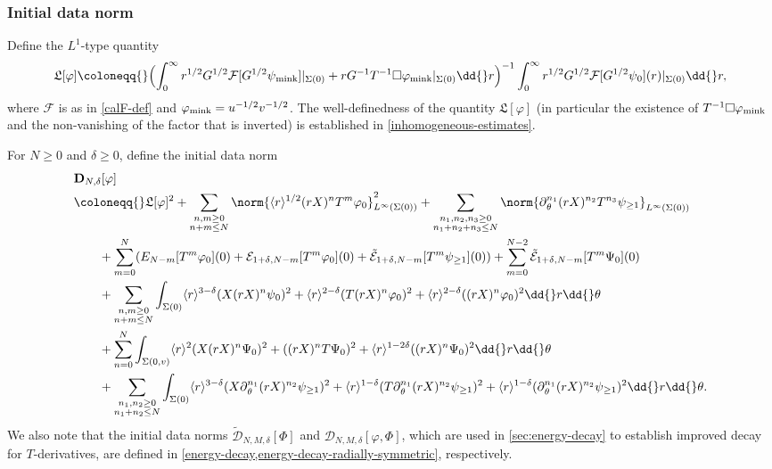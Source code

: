 \documentclass[10pt, reqno]{amsart}
\begin{document}
\subsubsection{Initial data norm}
\label{data-norm}
Define the \(L^1\)-type quantity
\begin{equation}\label{L-frak-def}
\mathfrak{L}[\varphi{}]\coloneqq{}\Bigl(\int_0^\infty r^{1/2}G^{1/2}\mathcal{F}[G^{1/2}\psi{}_{\textnormal{mink}}]|_{\Sigma{}(0)} + rG^{-1}T^{-1}\Box{}\varphi{}_{\textnormal{mink}}|_{\Sigma{}(0)}\dd{}r\Bigr)^{-1}\int_0^\infty r^{1/2}G^{1/2}\mathcal{F}[G^{1/2}\psi{}_0](r)|_{\Sigma{}(0)}\dd{}r,
\end{equation}
where \(\mathcal{F}\) is as in \cref{calF-def} and \(\varphi_{\textnormal{mink}} =
u^{-1/2}v^{-1/2}\). The well-definedness of the quantity
\(\mathfrak{L}[\varphi{}]\) (in particular the existence of
\(T^{-1}\Box{}\varphi_{\textnormal{mink}}\) and the non-vanishing of the factor
that is inverted) is established in \cref{inhomogeneous-estimates}.

For \(N\ge 0\) and \(\delta{} \ge 0\), define the initial data norm
\begin{equation}
\begin{split}
&\mathbf{D}_{N,\delta{}}[\varphi{}]\\
&\coloneqq{}\mathfrak{L}[\varphi{}]^2 +  \sum_{\substack{n,m\ge 0 \\ n+m\le N }}\norm{\langle{}r\rangle^{1/2}(rX)^nT^m\varphi{}_0}_{L^\infty(\Sigma{}(0))}^2 + \sum_{\substack{n_1,n_2,n_3\ge 0 \\ n_1+n_2+n_3\le N }}\norm{\partial{}_\theta^{n_1}(rX)^{n_2}T^{n_3}\psi{}_{\ge 1}}_{L^\infty(\Sigma{}(0))} \\
&\qquad + \sum_{m=0}^{N}(E_{N-m}[T^m\varphi{}_0](0) + \mathcal{E}_{1+\delta{},N-m}[T^m\varphi{}_0](0) + \tilde{\mathcal{E}}_{1+\delta{},N-m}[T^m\psi{}_{\ge 1}](0)) + \sum_{m=0}^{N-2} \tilde{\mathcal{E}}_{1+\delta{},N-m}[T^m\Psi{}_0](0) \\
&\qquad + \sum_{\substack{n,m\ge 0 \\ n+m\le N}} \int _{\Sigma{}(0)} \langle{}r\rangle^{3-\delta{}}(X(rX)^n\psi{}_0)^2 + \langle{}r\rangle^{2-\delta{}}(T(rX)^n\varphi{}_0)^2 + \langle{}r\rangle^{2-\delta{}}((rX)^n\varphi{}_0)^2\dd{}r\dd{}\theta{} \\
&\qquad  + \sum_{n=0}^N \int _{\Sigma{}(0,v)} \langle{}r\rangle^2(X(rX)^n\Psi{}_0)^2 + ((rX)^nT\Psi{}_0)^2 + \langle{}r\rangle^{1-2\delta{}}((rX)^n\Psi{}_0)^2 \dd{}r\dd{}\theta{} \\
&\qquad + \sum_{\substack{n_1,n_2\ge 0 \\ n_1 + n_2 \le N}} \int _{\Sigma{}(0)}\langle{}r\rangle^{3-\delta{}}(X\partial{}_\theta^{n_1}(rX)^{n_2}\psi{}_{\ge 1})^2 + \langle{}r\rangle^{1-\delta{}}(T\partial{}_\theta^{n_1}(rX)^{n_2}\psi{}_{\ge 1})^2 + \langle{}r\rangle^{1-\delta{}}(\partial{}_\theta^{n_1}(rX)^{n_2}\psi{}_{\ge 1})^2\dd{}r\dd{}\theta{}.
\end{split}
\end{equation}
We also note that the initial data norms \(\tilde{\mathcal{D}}_{N,M,\delta{}}[\Phi{}]\) and
\(\mathcal{D}_{N,M,\delta{}}[\varphi{},\Phi{}]\), which are used in
\cref{sec:energy-decay} to establish improved decay for \(T\)-derivatives, are
defined in \cref{energy-decay,energy-decay-radially-symmetric}, respectively.
\end{document}
